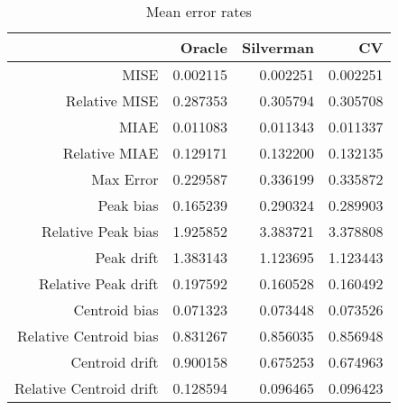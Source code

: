 \begin{table}[ht]
\centering
\begin{tabular}{rrrr}
  \hline
 & Oracle & Silverman & CV \\ 
  \hline
MISE & 0.002115 & 0.002251 & 0.002251 \\ 
  Relative MISE & 0.287353 & 0.305794 & 0.305708 \\ 
  MIAE & 0.011083 & 0.011343 & 0.011337 \\ 
  Relative MIAE & 0.129171 & 0.132200 & 0.132135 \\ 
  Max Error & 0.229587 & 0.336199 & 0.335872 \\ 
  Peak bias & 0.165239 & 0.290324 & 0.289903 \\ 
  Relative Peak bias & 1.925852 & 3.383721 & 3.378808 \\ 
  Peak drift & 1.383143 & 1.123695 & 1.123443 \\ 
  Relative Peak drift & 0.197592 & 0.160528 & 0.160492 \\ 
  Centroid bias & 0.071323 & 0.073448 & 0.073526 \\ 
  Relative Centroid bias & 0.831267 & 0.856035 & 0.856948 \\ 
  Centroid drift & 0.900158 & 0.675253 & 0.674963 \\ 
  Relative Centroid drift & 0.128594 & 0.096465 & 0.096423 \\ 
   \hline
\end{tabular}
\caption{Mean error rates} 
\label{tbl:mean_error_rates}
\end{table}
